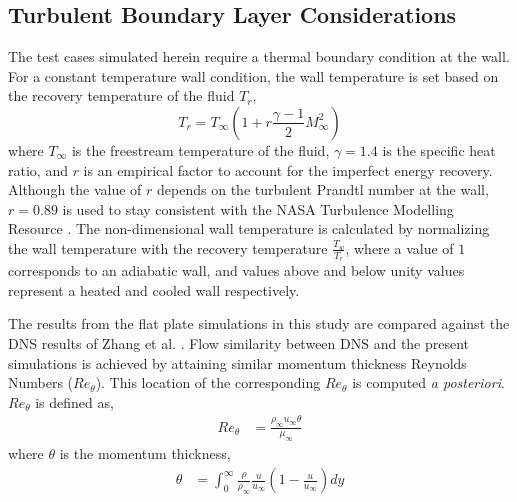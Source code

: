 \documentclass[journal ]{new-aiaa}
\begin{document}
\subsection{Turbulent Boundary Layer Considerations}
The test cases simulated herein require a thermal boundary condition at the wall. For a constant temperature wall condition, the wall temperature is set based on the recovery temperature of the fluid $T_r$,
    \begin{equation}
        T_{r} = T_{\infty} \left(1 + r \frac{\gamma - 1}{2} M_{\infty}^2\right)
    \end{equation}
where $T_{\infty}$ is the freestream temperature of the fluid, $\gamma = 1.4$ is the specific heat ratio, and $r$ is an empirical factor to account for the imperfect energy recovery. Although the value of $r$ depends on the turbulent Prandtl number at the wall, $r = 0.89$ is used to stay consistent with the NASA Turbulence Modelling Resource \cite{Rumsey2016NASA}. The non-dimensional wall temperature is calculated by normalizing the wall temperature with the recovery temperature $\frac{T_w}{T_{r}}$, where a value of $1$ corresponds to an adiabatic wall, and values above and below unity values represent a heated and cooled wall respectively. 

The results from the flat plate simulations in this study are compared against the DNS results of  Zhang et al. \cite{Zhang2018DNS}. Flow similarity between DNS and the present simulations is achieved by attaining similar momentum thickness Reynolds Numbers ($Re_{\theta}$). This location of the corresponding $Re_{\theta}$ is computed \emph{a posteriori}. $Re_{\theta}$ is defined as,
\begin{align}
\label{eqn:Re_theta}
    Re_{\theta} &= \frac{\rho_{\infty} u_{\infty} \theta}{\mu_{\infty}}
\end{align}
where $\theta$ is the momentum thickness,
\begin{align}
        \theta &= \int^{\infty}_{0} \frac{\rho}{\rho_{\infty}} \frac{u}{u_{\infty}} \left( 1 - \frac{u}{u_{\infty}} \right) dy
\end{align}
\end{document}

